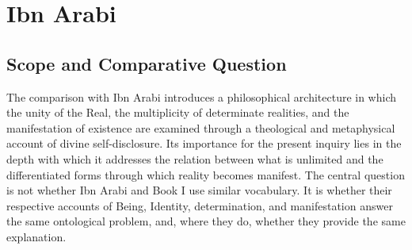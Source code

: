 
%
%
%
%

\section{Ibn Arabi}
\label{sec:ch08_s16}



\subsection{Scope and Comparative Question}
\label{subsec:ch08_s16_ss01}

\label{para:VS.B01.P01.C08.S16.SS01.P001}

The comparison with Ibn Arabi introduces a philosophical
architecture in which the unity of the Real, the multiplicity
of determinate realities, and the manifestation of existence
are examined through a theological and metaphysical account
of divine self-disclosure. Its importance for the present
inquiry lies in the depth with which it addresses the relation
between what is unlimited and the differentiated forms
through which reality becomes manifest. The central question
is not whether Ibn Arabi and Book I use similar vocabulary.
It is whether their respective accounts of Being, Identity,
determination, and manifestation answer the same ontological
problem, and, where they do, whether they provide the same
explanation.

